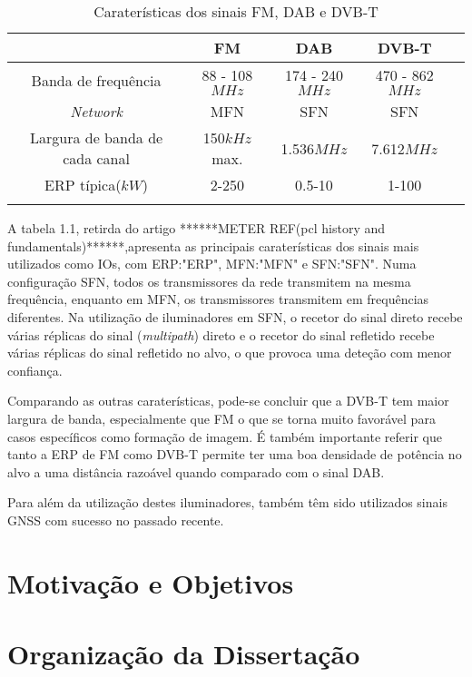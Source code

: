 \begin{table}[h]
\centering
\begin{tabular}{@{}ccccc@{}}
\toprule
                    	 & FM                & DAB     & DVB-T     \\ \midrule
Banda de frequência      & 88 - 108$MHz$   & 174 - 240$MHz$  & 470 - 862$MHz$           \\
\textit{Network}    			 & MFN   & SFN   & SFN \\
Largura de banda de cada canal    & 150$kHz$ max.      & 1.536$MHz$  & 7.612$MHz$   \\ 
ERP típica($kW$)      & 2-250         & 0.5-10    & 1-100            \\ \bottomrule
\label{tab:cara}
\end{tabular}
\caption[Caraterísticas dos sinais FM, DAB e DVB-T]{Caraterísticas dos sinais FM, DAB e DVB-T}
\end{table} 
\par
A tabela 1.1, retirda do artigo ******METER REF(pcl history and fundamentals)******,apresenta as principais caraterísticas dos sinais mais utilizados como \gls{IO}s, com ERP:"\gls{ERP}", MFN:"\gls{MFN}" e SFN:"\gls{SFN}". Numa configuração \gls{SFN}, todos os transmissores da rede transmitem na mesma frequência, enquanto em \gls{MFN}, os transmissores transmitem em frequências diferentes. Na utilização de iluminadores em \gls{SFN}, o recetor do sinal direto recebe várias réplicas do sinal (\textit{multipath}) direto e o recetor do sinal refletido recebe várias réplicas do sinal refletido no alvo, o que provoca uma deteção com menor confiança.\par 
Comparando as outras caraterísticas, pode-se concluir que a \gls{DVB-T} tem maior largura de banda, especialmente que \gls{FM} o que se torna muito favorável para casos específicos como formação de imagem. É também importante referir que tanto a \gls{ERP} de \gls{FM} como \gls{DVB-T} permite ter uma boa densidade de potência no alvo a uma distância razoável quando comparado com o sinal \gls{DAB}.\par 
Para além da utilização destes iluminadores, também têm sido utilizados sinais \gls{GNSS} com sucesso no passado recente.

\section{Motivação e Objetivos}


\section{Organização da Dissertação}